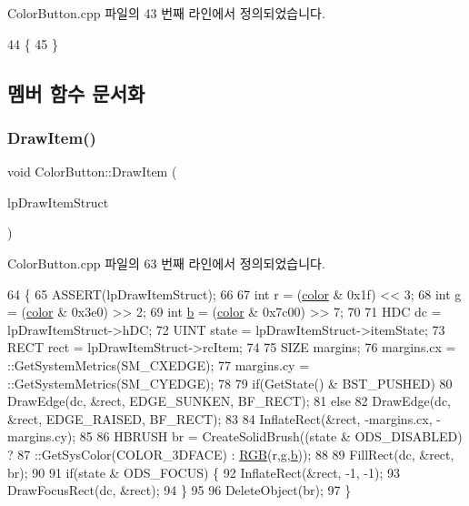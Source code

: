 Color\+Button.\+cpp 파일의 43 번째 라인에서 정의되었습니다.


\begin{DoxyCode}
44 \{
45 \}
\end{DoxyCode}


\subsection{멤버 함수 문서화}
\mbox{\label{class_color_button_a48b973ebb6644f474f64ff1e8fbb1adf}} 
\subsubsection{\texorpdfstring{Draw\+Item()}{DrawItem()}}
{\footnotesize\ttfamily void Color\+Button\+::\+Draw\+Item (\begin{DoxyParamCaption}\item[{L\+P\+D\+R\+A\+W\+I\+T\+E\+M\+S\+T\+R\+U\+CT}]{lp\+Draw\+Item\+Struct }\end{DoxyParamCaption})}



Color\+Button.\+cpp 파일의 63 번째 라인에서 정의되었습니다.


\begin{DoxyCode}
64 \{
65   ASSERT(lpDrawItemStruct);
66   
67   \textcolor{keywordtype}{int} r = (\mbox{\hyperlink{class_color_button_ac2e59577aba7413fbf40c97f21df4835}{color}} & 0x1f) << 3;
68   \textcolor{keywordtype}{int} g = (\mbox{\hyperlink{class_color_button_ac2e59577aba7413fbf40c97f21df4835}{color}} & 0x3e0) >> 2;
69   \textcolor{keywordtype}{int} \mbox{\hyperlink{expr-lex_8cpp_a91b64995742fd30063314f12340b4b5a}{b}} = (\mbox{\hyperlink{class_color_button_ac2e59577aba7413fbf40c97f21df4835}{color}} & 0x7c00) >> 7;
70 
71   HDC dc = lpDrawItemStruct->hDC;
72   UINT state = lpDrawItemStruct->itemState;
73   RECT rect = lpDrawItemStruct->rcItem;
74 
75   SIZE margins;
76   margins.cx = ::GetSystemMetrics(SM\_CXEDGE);
77   margins.cy = ::GetSystemMetrics(SM\_CYEDGE);
78 
79   \textcolor{keywordflow}{if}(GetState() & BST\_PUSHED)
80     DrawEdge(dc, &rect, EDGE\_SUNKEN, BF\_RECT);
81   \textcolor{keywordflow}{else}
82     DrawEdge(dc, &rect, EDGE\_RAISED, BF\_RECT);
83 
84   InflateRect(&rect, -margins.cx, -margins.cy);
85   
86   HBRUSH br = CreateSolidBrush((state & ODS\_DISABLED) ? 
87                                ::GetSysColor(COLOR\_3DFACE) : \mbox{\hyperlink{bilinear_8cpp_a4a118ad3ee36468a3fa616977a64864e}{RGB}}(r,g,\mbox{\hyperlink{expr-lex_8cpp_a91b64995742fd30063314f12340b4b5a}{b}}));
88 
89   FillRect(dc, &rect, br);
90 
91   \textcolor{keywordflow}{if}(state & ODS\_FOCUS) \{
92     InflateRect(&rect, -1, -1);
93     DrawFocusRect(dc, &rect);
94   \}
95   
96   DeleteObject(br);
97 \}
\end{DoxyCode}
\mbox{\label{class_color_button_a2252acea0c111e198cc5bcc914e2cfeb}} 
